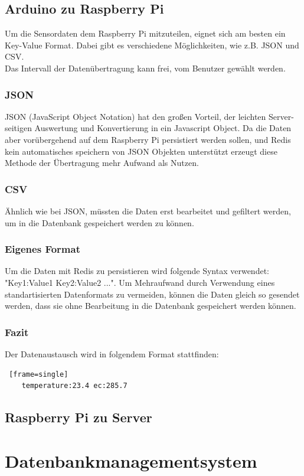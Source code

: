 \documentclass[11pt]{article}
\begin{document}
\subsection{Arduino zu Raspberry Pi}
Um die Sensordaten dem Raspberry Pi mitzuteilen, eignet sich am besten ein Key-Value Format. Dabei gibt es verschiedene M\"oglichkeiten, wie z.B. JSON und CSV. \\
Das Intervall der Daten\"ubertragung kann frei, vom Benutzer gew\"ahlt werden.
\subsubsection{JSON}
JSON (JavaScript Object Notation) hat den gro{\ss}en Vorteil, der leichten Server-seitigen Auswertung und Konvertierung in ein Javascript Object. Da die Daten aber vor\"ubergehend auf dem Raspberry Pi persistiert werden sollen, und Redis kein automatisches speichern von JSON Objekten unterst\"utzt erzeugt diese Methode der \"Ubertragung mehr Aufwand als Nutzen.
\subsubsection{CSV}
\"Ahnlich wie bei JSON, m\"ussten die Daten erst bearbeitet und gefiltert werden, um in die Datenbank gespeichert werden zu k\"onnen.
\subsubsection{Eigenes Format}
Um die Daten mit Redis zu persistieren wird folgende Syntax verwendet: "Key1:Value1 Key2:Value2 ...". Um Mehraufwand durch Verwendung eines standartisierten Datenformats zu vermeiden, k\"onnen die Daten gleich so gesendet werden, dass sie ohne Bearbeitung in die Datenbank gespeichert werden k\"onnen.
\subsubsection{Fazit}
Der Datenaustausch wird in folgendem Format stattfinden:
\begin{lstlisting} [frame=single]
	temperature:23.4 ec:285.7
\end{lstlisting}

\subsection{Raspberry Pi zu Server}

\newpage
\section{Datenbankmanagementsystem}
\end{document}
